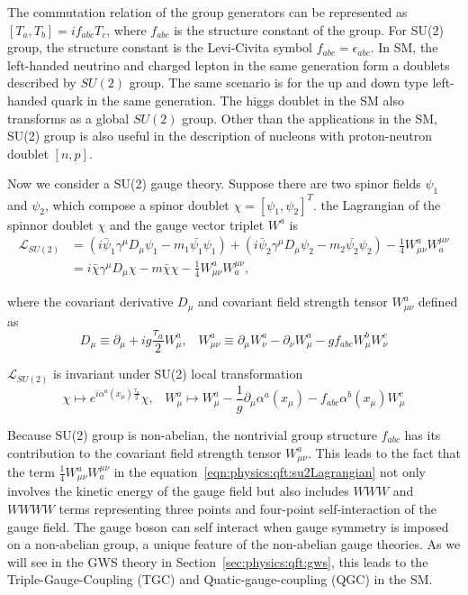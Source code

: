 \noindent The commutation relation of the group generators can be represented as $[T_a, T_b] = i f_{abc} T_c$, where $f_{abc}$ is the structure constant of the group. For SU(2) group, the structure constant is the Levi-Civita symbol $f_{abc}=\epsilon_{abc}$. In SM, the left-handed neutrino and charged lepton in the same generation form a doublets described by $SU(2)$ group. The same scenario is for the up and down type left-handed quark in the same generation. The higgs doublet in the SM also transforms as a global $SU(2)$ group. Other than the applications in the SM, SU(2) group is also useful in the description of nucleons with proton-neutron doublet $[n, p]$. 

\noindent Now we consider a SU(2) gauge theory. Suppose there are two spinor fields $\psi_1$ and $\psi_2$, which compose a spinor doublet $\chi = [ \psi_1, \psi_2 ]^T$. the Lagrangian of the spinnor doublet $\chi$ and the gauge vector triplet $W^a$ is
%
\begin{equation}
\begin{split}
    \mathcal{L}_{SU(2)}  &= (i\bar{\psi}_1\gamma^\mu D_\mu \psi_1  - m_1\bar{\psi_1} \psi_1) + (i\bar{\psi}_2\gamma^\mu D_\mu \psi_2  - m_2\bar{\psi_2} \psi_2)  - \frac{1}{4}W^a_{\mu\nu}W^{\mu\nu}_a \\
    &= i\bar{\chi}\gamma^\mu D_\mu \chi  - m\bar{\chi} \chi  - \frac{1}{4}W^a_{\mu\nu}W^{\mu\nu}_a,
\end{split}
\label{eqn:physics:qft:su2Lagrangian}
\end{equation}

\noindent where the covariant derivative $D_\mu$ and covariant field strength tensor $W^a_{\mu\nu}$ defined as
%
\begin{equation}
    D_\mu \equiv \partial_\mu +i g \frac{\tau_a}{2} W^a_\mu , \;\;\; 
    W^a_{\mu\nu} \equiv  \partial_\mu W^a_\nu - \partial_\nu W^a_\mu - g f_{abc} W^b_\mu W^c_\nu
\end{equation}

\noindent $\mathcal{L}_{SU(2)}$ is invariant under SU(2) local transformation 
%
\begin{equation}
	\chi \longmapsto  e^{i\alpha^a (x_\mu) \frac{\tau_a}{2}} \chi , \;\;\; 
    W^a_\mu \longmapsto  W^a_\mu - \frac{1}{g}\partial_\mu \alpha^a(x_\mu) - f_{abc}\alpha^b(x_\mu) W^c_\mu 
\end{equation}

\noindent Because SU(2) group is non-abelian, the nontrivial group structure $f_{abc}$ has its contribution to the covariant field strength tensor $W^a_{\mu\nu}$. This leads to the fact that the term $\frac{1}{4}W^a_{\mu\nu}W^{\mu\nu}_a$ in the equation~\ref{eqn:physics:qft:su2Lagrangian} not only involves the kinetic energy of the gauge field but also includes $WWW$ and $WWWW$ terms representing three points and four-point self-interaction of the gauge field. The gauge boson can self interact when gauge symmetry is imposed on a non-abelian group, a unique feature of the non-abelian gauge theories. As we will see in the GWS theory in Section~\ref{sec:physics:qft:gws}, this leads to the Triple-Gauge-Coupling (TGC) and Quatic-gauge-coupling (QGC) in the SM.




